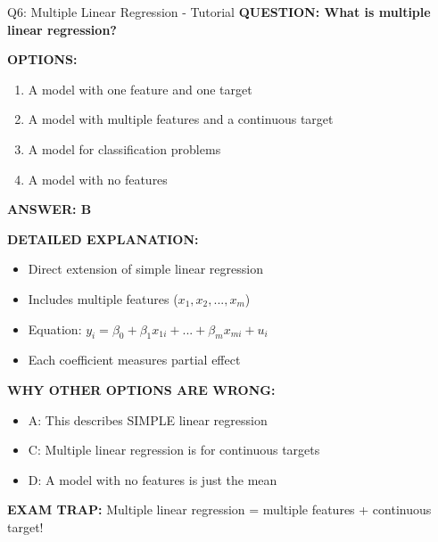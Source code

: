 \documentclass[8pt]{beamer}
\begin{document}
	\begin{frame}{Q6: Multiple Linear Regression - Tutorial}
		\fontsize{6.5}{7.5}\selectfont
		\textbf{QUESTION: What is multiple linear regression?}
		
		\vspace{0.1cm}
		\textbf{OPTIONS:}
		\begin{enumerate}
			\item A model with one feature and one target
			\item A model with multiple features and a continuous target
			\item A model for classification problems
			\item A model with no features
		\end{enumerate}
		
		\vspace{0.1cm}
		\textcolor{myblue}{\textbf{ANSWER: B}}
		
		\vspace{0.1cm}
		\textbf{DETAILED EXPLANATION:}
		\begin{itemize}
			\item Direct extension of simple linear regression
			\item Includes multiple features ($x_1, x_2, ..., x_m$)
			\item Equation: $y_i = \beta_0 + \beta_1 x_{1i} + ... + \beta_m x_{mi} + u_i$
			\item Each coefficient measures partial effect
		\end{itemize}
		
		\vspace{0.1cm}
		\textcolor{myred}{\textbf{WHY OTHER OPTIONS ARE WRONG:}}
		\begin{itemize}
			\item \textcolor{myred}{A:} This describes SIMPLE linear regression
			\item \textcolor{myred}{C:} Multiple linear regression is for continuous targets
			\item \textcolor{myred}{D:} A model with no features is just the mean
		\end{itemize}
		
		\textcolor{myred}{\textbf{EXAM TRAP:}} Multiple linear regression = \textcolor{myblue}{multiple features + continuous target}!
	\end{frame}
	
\end{document}
